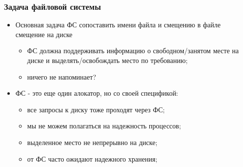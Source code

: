 \begin{frame}
\frametitle{Задача файловой системы}
\begin{itemize}
  \item<1-> Основная задача ФС сопоставить имени файла и смещению в файле смещение на диске
    \begin{itemize}
      \item ФС должна поддерживать информацию о свободном/занятом месте на диске и выделять/освобождать место по требованию;
      \item ничего не напоминает?
    \end{itemize}
  \item<2-> ФС - это еще один алокатор, но со своей спецификой:
    \begin{itemize}
      \item все запросы к диску тоже проходят через ФС;
      \item мы не можем полагаться на надежность процессов;
      \item выделенное место не непрерывно на диске;
      \item от ФС часто ожидают надежного хранения;
    \end{itemize}
\end{itemize}
\end{frame}
